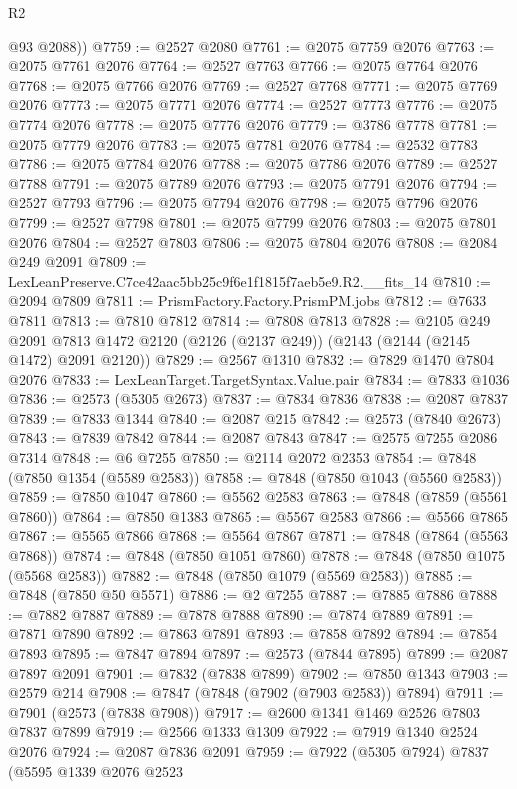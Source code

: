 \begin{lexlean}{R2}
\begin{coremodule}
        @93
        @2088))
@7759 := @2527 @2080
@7761 := @2075 @7759 @2076
@7763 := @2075 @7761 @2076
@7764 := @2527 @7763
@7766 := @2075 @7764 @2076
@7768 := @2075 @7766 @2076
@7769 := @2527 @7768
@7771 := @2075 @7769 @2076
@7773 := @2075 @7771 @2076
@7774 := @2527 @7773
@7776 := @2075 @7774 @2076
@7778 := @2075 @7776 @2076
@7779 := @3786 @7778
@7781 := @2075 @7779 @2076
@7783 := @2075 @7781 @2076
@7784 := @2532 @7783
@7786 := @2075 @7784 @2076
@7788 := @2075 @7786 @2076
@7789 := @2527 @7788
@7791 := @2075 @7789 @2076
@7793 := @2075 @7791 @2076
@7794 := @2527 @7793
@7796 := @2075 @7794 @2076
@7798 := @2075 @7796 @2076
@7799 := @2527 @7798
@7801 := @2075 @7799 @2076
@7803 := @2075 @7801 @2076
@7804 := @2527 @7803
@7806 := @2075 @7804 @2076
@7808 := @2084 @249 @2091
@7809 := LexLeanPreserve.C7ce42aac5bb25c9f6e1f1815f7aeb5e9.R2.__fits_14
@7810 := @2094 @7809
@7811 := PrismFactory.Factory.PrismPM.jobs
@7812 := @7633 @7811
@7813 := @7810 @7812
@7814 := @7808 @7813
@7828 := @2105
    @249
    @2091
    @7813
    @1472
    @2120
    (@2126 (@2137 @249))
    (@2143 (@2144 (@2145 @1472) @2091 @2120))
@7829 := @2567 @1310
@7832 := @7829 @1470 @7804 @2076
@7833 := LexLeanTarget.TargetSyntax.Value.pair
@7834 := @7833 @1036
@7836 := @2573 (@5305 @2673)
@7837 := @7834 @7836
@7838 := @2087 @7837
@7839 := @7833 @1344
@7840 := @2087 @215
@7842 := @2573 (@7840 @2673)
@7843 := @7839 @7842
@7844 := @2087 @7843
@7847 := @2575 @7255 @2086 @7314
@7848 := @6 @7255
@7850 := @2114 @2072 @2353
@7854 := @7848 (@7850 @1354 (@5589 @2583))
@7858 := @7848 (@7850 @1043 (@5560 @2583))
@7859 := @7850 @1047
@7860 := @5562 @2583
@7863 := @7848 (@7859 (@5561 @7860))
@7864 := @7850 @1383
@7865 := @5567 @2583
@7866 := @5566 @7865
@7867 := @5565 @7866
@7868 := @5564 @7867
@7871 := @7848 (@7864 (@5563 @7868))
@7874 := @7848 (@7850 @1051 @7860)
@7878 := @7848 (@7850 @1075 (@5568 @2583))
@7882 := @7848 (@7850 @1079 (@5569 @2583))
@7885 := @7848 (@7850 @50 @5571)
@7886 := @2 @7255
@7887 := @7885 @7886
@7888 := @7882 @7887
@7889 := @7878 @7888
@7890 := @7874 @7889
@7891 := @7871 @7890
@7892 := @7863 @7891
@7893 := @7858 @7892
@7894 := @7854 @7893
@7895 := @7847 @7894
@7897 := @2573 (@7844 @7895)
@7899 := @2087 @7897 @2091
@7901 := @7832 (@7838 @7899)
@7902 := @7850 @1343
@7903 := @2579 @214
@7908 := @7847 (@7848 (@7902 (@7903 @2583)) @7894)
@7911 := @7901 (@2573 (@7838 @7908))
@7917 := @2600 @1341 @1469 @2526 @7803 @7837 @7899
@7919 := @2566 @1333 @1309
@7922 := @7919 @1340 @2524 @2076
@7924 := @2087 @7836 @2091
@7959 := @7922
    (@5305 @7924)
    @7837
    (@5595
      @1339
      @2076
      @2523

\end{coremodule}
\end{lexlean}
